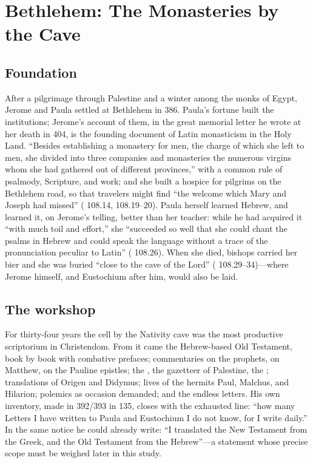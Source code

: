 \section{Bethlehem: The Monasteries by the Cave}

\subsection{Foundation}

After a pilgrimage through Palestine and a winter among the monks of Egypt,
Jerome and Paula settled at Bethlehem in 386. Paula's fortune built the
institutions; Jerome's account of them, in the great memorial letter he wrote
at her death in 404, is the founding document of Latin monasticism in the Holy
Land. ``Besides establishing a monastery for men, the charge of which she left
to men, she divided into three companies and monasteries the numerous virgins
whom she had gathered out of different provinces,'' with a common rule of
psalmody, Scripture, and work; and she built a hospice for pilgrims on the
Bethlehem road, so that travelers might find ``the welcome which Mary and
Joseph had missed'' ( 108.14, 108.19--20). Paula herself learned
Hebrew, and learned it, on Jerome's telling, better than her teacher: while he
had acquired it ``with much toil and effort,'' she ``succeeded so well that
she could chant the psalms in Hebrew and could speak the language without a
trace of the pronunciation peculiar to Latin'' ( 108.26). When
she died, bishops carried her bier and she was buried ``close to the cave of
the Lord'' ( 108.29--34)---where Jerome himself, and Eustochium
after him, would also be laid.

\subsection{The workshop}

For thirty-four years the cell by the Nativity cave was the most productive
scriptorium in Christendom. From it came the Hebrew-based Old Testament,
book by book with combative prefaces; commentaries on the prophets, on
Matthew, on the Pauline epistles; the , the
gazetteer of Palestine, the ; translations
of Origen and Didymus; lives of the hermits Paul, Malchus, and Hilarion;
polemics as occasion demanded; and the endless letters. His own inventory,
made in 392/393 in  135, closes with the exhausted
line: ``how many Letters I have written to Paula and Eustochium I do not know,
for I write daily.'' In the same notice he could already write: ``I translated
the New Testament from the Greek, and the Old Testament from the Hebrew''---a
statement whose precise scope must be weighed later in this study.

